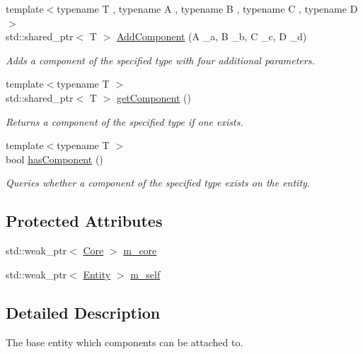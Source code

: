 \begin{DoxyCompactItemize}
{\footnotesize template$<$typename T , typename A , typename B , typename C , typename D $>$ }\\std\+::shared\+\_\+ptr$<$ T $>$ \hyperlink{classfrontier_1_1_entity_a892c1807ca5a19e92b9e4f4d04b26131}{Add\+Component} (A \+\_\+a, B \+\_\+b, C \+\_\+c, D \+\_\+d)
\begin{DoxyCompactList}\small\item\em Adds a component of the specified type with four additional parameters. \end{DoxyCompactList}\item 
{\footnotesize template$<$typename T $>$ }\\std\+::shared\+\_\+ptr$<$ T $>$ \hyperlink{classfrontier_1_1_entity_a7657bce9cd7f405f69e59c61a69adf86}{get\+Component} ()
\begin{DoxyCompactList}\small\item\em Returns a component of the specified type if one exists. \end{DoxyCompactList}\item 
{\footnotesize template$<$typename T $>$ }\\bool \hyperlink{classfrontier_1_1_entity_a52e5f9cb6d6f8fddef34f58b7cc5daa8}{has\+Component} ()
\begin{DoxyCompactList}\small\item\em Queries whether a component of the specified type exists on the entity. \end{DoxyCompactList}\end{DoxyCompactItemize}
\subsection*{Protected Attributes}
\begin{DoxyCompactItemize}
\item 
std\+::weak\+\_\+ptr$<$ \hyperlink{classfrontier_1_1_core}{Core} $>$ \hyperlink{classfrontier_1_1_entity_a51d9396520afa49f35aa9459ce4f6134}{m\+\_\+core}
\item 
std\+::weak\+\_\+ptr$<$ \hyperlink{classfrontier_1_1_entity}{Entity} $>$ \hyperlink{classfrontier_1_1_entity_acba38b7e5d44225066175d451de59c50}{m\+\_\+self}
\end{DoxyCompactItemize}


\subsection{Detailed Description}
The base entity which components can be attached to. 

